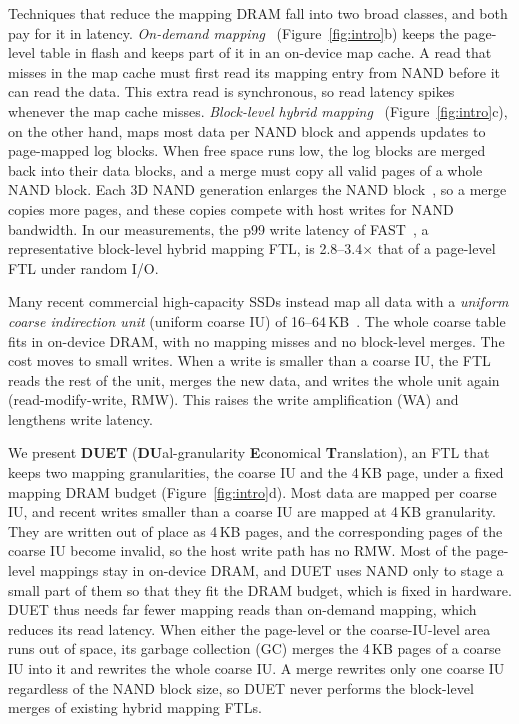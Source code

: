 Techniques that reduce the mapping DRAM fall into two broad classes, and both
pay for it in latency.
\emph{On-demand mapping}~\cite{dftl,leaftl} (Figure~\ref{fig:intro}b) keeps the
page-level table in flash and keeps part of it in an on-device map cache.
A read that misses in the map cache must first read its mapping entry from
NAND before it can read the data. This extra read is synchronous, so read
latency spikes whenever the map cache misses.
\emph{Block-level hybrid mapping}~\cite{bast,fast,janusftl,cftl}
(Figure~\ref{fig:intro}c), on the other hand, maps most data
per NAND block and appends updates to page-mapped log blocks. When free space
runs low, the log blocks are merged back into their data blocks, and a merge
must copy all valid pages of a whole NAND block. Each 3D NAND generation
enlarges the NAND block~\cite{pen}, so a merge copies more pages,
and these copies compete with host writes for NAND bandwidth. In our measurements, the p99 write latency
of FAST~\cite{fast}, a representative block-level hybrid mapping FTL, is 2.8--3.4$\times$ that of a page-level FTL under random I/O.

Many recent commercial high-capacity SSDs instead map all data with a
\emph{uniform coarse indirection unit} (uniform coarse IU) of 16--64\,KB~\cite{micron-iu,solidigm-csal}. The
whole coarse table fits in on-device DRAM, with no mapping misses and no block-level merges.
The cost moves to small writes. When a write is smaller than a coarse IU, the FTL
reads the rest of the unit, merges the new data, and writes the whole unit again
(read-modify-write, RMW). This raises the write amplification (WA) and
lengthens write latency.

We present \textbf{DUET} (\textbf{DU}al-granularity \textbf{E}conomical
\textbf{T}ranslation), an FTL that keeps two mapping granularities, the coarse IU
and the 4\,KB page, under a fixed mapping DRAM budget (Figure~\ref{fig:intro}d). Most data are mapped per coarse IU, and recent writes smaller than a
coarse IU are mapped at 4\,KB granularity. They are written out of place as 4\,KB
pages, and the corresponding pages of the coarse IU become invalid, so the host
write path has no RMW. Most of the page-level mappings stay in on-device
DRAM, and DUET uses NAND only to stage a small part of them so that they fit
the DRAM budget, which is fixed in hardware. DUET thus needs far fewer mapping
reads than on-demand mapping, which reduces its read latency.
When either the page-level or the coarse-IU-level area runs out of
space, its garbage collection (GC) merges the 4\,KB pages of a coarse IU into it and
rewrites the whole coarse IU. A merge rewrites only one coarse IU regardless of the NAND
block size, so DUET never performs the block-level merges of existing hybrid mapping FTLs.

